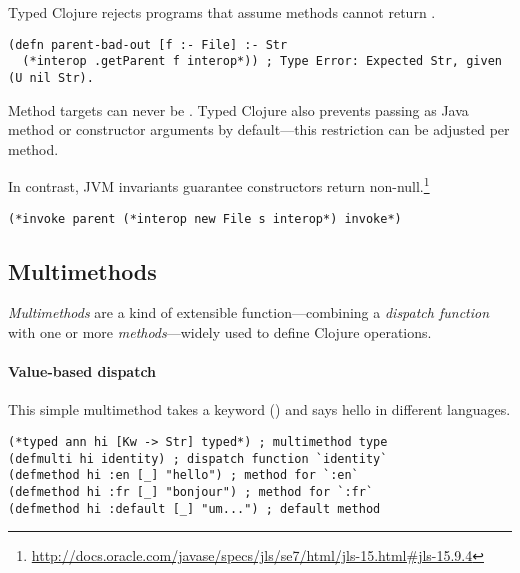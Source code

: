 Typed Clojure rejects programs that assume methods cannot return .
%
\begin{lstlisting}
(defn parent-bad-out [f :- File] :- Str
  (*interop .getParent f interop*)) ; Type Error: Expected Str, given (U nil Str).
\end{lstlisting}
Method targets can never be .
Typed Clojure also prevents passing  as Java method or
constructor arguments by default---this restriction can be
adjusted per method.

%
%
%
In contrast, JVM invariants guarantee constructors return non-null.\footnote{\url{http://docs.oracle.com/javase/specs/jls/se7/html/jls-15.html#jls-15.9.4}}
%
\begin{exmp}
\begin{lstlisting}
(*invoke parent (*interop new File s interop*) invoke*)
\end{lstlisting}
\end{exmp}


\subsection{Multimethods}

\label{sec:multioverview}

\emph{Multimethods} are a kind of extensible function---combining a \emph{dispatch function} with 
one or more \emph{methods}---widely used to define Clojure operations.

\paragraph{Value-based dispatch}
This simple multimethod takes a keyword () and says hello in different languages.%

\begin{exmp}
\begin{lstlisting}
(*typed ann hi [Kw -> Str] typed*) ; multimethod type
(defmulti hi identity) ; dispatch function `identity`
(defmethod hi :en [_] "hello") ; method for `:en`
(defmethod hi :fr [_] "bonjour") ; method for `:fr`
(defmethod hi :default [_] "um...") ; default method
\end{lstlisting}
\label{example:hi-multimethod}
\end{exmp}

